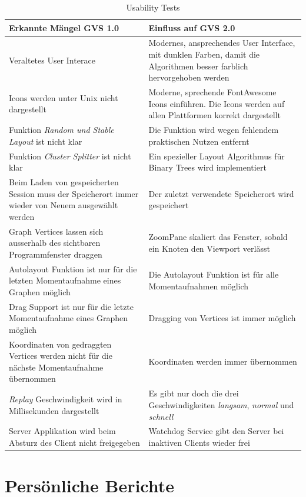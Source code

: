 \documentclass[11pt,a4paper,english,oneside]{book}
\numberwithin{equation}{chapter}
\begin{document}
	\begin{table}[h!]
		\centering
		\begin{tabularx}{\linewidth}{X X }
			\toprule 
			Erkannte Mängel GVS 1.0 & Einfluss auf GVS 2.0\\
			\midrule
			Veraltetes User Interace & Modernes, ansprechendes User Interface, mit dunklen Farben, damit die Algorithmen besser farblich hervorgehoben werden \\
			Icons werden unter Unix nicht dargestellt & Moderne, sprechende FontAwesome Icons einführen. Die Icons werden auf allen Plattformen korrekt dargestellt \\
			Funktion \textit{Random und Stable Layout} ist nicht klar & Die Funktion wird wegen fehlendem praktischen Nutzen entfernt \\
			Funktion \textit{Cluster Splitter} ist nicht klar & Ein spezieller Layout Algorithmus für Binary Trees wird implementiert \\
			Beim Laden von gespeicherten Session muss der Speicherort immer wieder von Neuem ausgewählt werden & Der zuletzt verwendete Speicherort wird gespeichert \\
			Graph Vertices lassen sich ausserhalb des sichtbaren Programmfenster draggen & ZoomPane skaliert das Fenster, sobald ein Knoten den Viewport verlässt \\
			Autolayout Funktion ist nur für die letzten Momentaufnahme eines Graphen möglich & Die Autolayout Funktion ist für alle Momentaufnahmen möglich \\
			Drag Support ist nur für die letzte Momentaufnahme eines Graphen möglich & Dragging von Vertices ist immer möglich \\
			Koordinaten von gedraggten Vertices werden nicht für die nächste Momentaufnahme übernommen & Koordinaten werden immer übernommen \\
			\textit{Replay} Geschwindigkeit wird in Millisekunden dargestellt & Es gibt nur doch die drei Geschwindigkeiten \textit{langsam}, \textit{normal} und \textit{schnell} \\
			Server Applikation wird beim Absturz des Client nicht freigegeben & Watchdog Service gibt den Server bei inaktiven Clients wieder frei \\
			\bottomrule 
		\end{tabularx} 
		\caption{Usability Tests} 
	\end{table}
	
	\chapter{Persönliche Berichte}
	\label{erfahrungsberichte}
\end{document}
